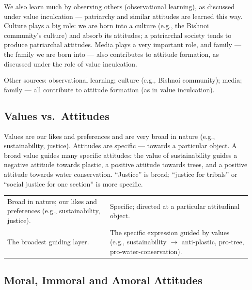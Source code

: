 We also learn much by observing others (observational learning), as discussed under value inculcation --- patriarchy and similar attitudes are learned this way. Culture plays a big role: we are born into a culture (e.g., the Bishnoi community's culture) and absorb its attitudes; a patriarchal society tends to produce patriarchal attitudes. Media plays a very important role, and family --- the family we are born into --- also contributes to attitude formation, as discussed under the role of value inculcation.

\begin{KeyConcept}
Other sources: observational learning; culture (e.g., Bishnoi community); media; family --- all contribute to attitude formation (as in value inculcation).
\end{KeyConcept}

\subsection{Values vs.\ Attitudes}

Values are our likes and preferences and are very broad in nature (e.g., sustainability, justice). Attitudes are specific --- towards a particular object. A broad value guides many specific attitudes: the value of sustainability guides a negative attitude towards plastic, a positive attitude towards trees, and a positive attitude towards water conservation. ``Justice'' is broad; ``justice for tribals'' or ``social justice for one section'' is more specific.

\begin{center}
\begin{tabularx}{\textwidth}{Y Y}
 &  \\
\toprule
Broad in nature; our likes and preferences (e.g., sustainability, justice). & Specific; directed at a particular attitudinal object. \\
The broadest guiding layer. & The specific expression guided by values (e.g., sustainability $\rightarrow$ anti-plastic, pro-tree, pro-water-conservation). \\
\bottomrule
\end{tabularx}
\end{center}

\subsection{Moral, Immoral and Amoral Attitudes}

